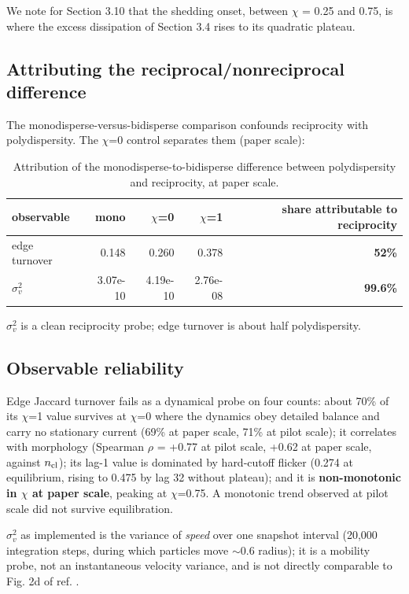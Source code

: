 \documentclass[aps,pre,preprint,superscriptaddress,nofootinbib,longbibliography]{revtex4-2}
\begin{document}
We note for Section 3.10 that the shedding onset, between $\chi$ = 0.25 and 0.75, is where the excess dissipation of Section 3.4 rises to its quadratic plateau.

\subsection{Attributing the reciprocal/nonreciprocal difference}

The monodisperse-versus-bidisperse comparison confounds reciprocity with polydispersity. The $\chi$=0 control separates them (paper scale):

\begin{table}[htbp]
\caption{Attribution of the monodisperse-to-bidisperse difference between polydispersity and reciprocity, at paper scale.}
\label{tab:6}
\begin{ruledtabular}
\begin{tabular}{lrrrr}
observable & mono & $\chi$=0 & $\chi$=1 & share attributable to reciprocity \\
\hline
edge turnover & 0.148 & 0.260 & 0.378 & \textbf{52\%} \\
$\sigma^2_v$ & 3.07e-10 & 4.19e-10 & 2.76e-08 & \textbf{99.6\%} \\
\end{tabular}
\end{ruledtabular}
\end{table}

$\sigma^2_v$ is a clean reciprocity probe; edge turnover is about half polydispersity.

\subsection{Observable reliability}

Edge Jaccard turnover fails as a dynamical probe on four counts: about 70\% of its $\chi$=1 value survives at $\chi$=0 where the dynamics obey detailed balance and carry no stationary current (69\% at paper scale, 71\% at pilot scale); it correlates with morphology (Spearman $\rho$ = +0.77 at pilot scale, +0.62 at paper scale, against $n_{\rm cl}$); its lag-1 value is dominated by hard-cutoff flicker (0.274 at equilibrium, rising to 0.475 by lag 32 without plateau); and it is \textbf{non-monotonic in $\chi$ at paper scale}, peaking at $\chi$=0.75. A monotonic trend observed at pilot scale did not survive equilibration.

$\sigma^2_v$ as implemented is the variance of \emph{speed} over one snapshot interval (20,000 integration steps, during which particles move $\sim$0.6 radius); it is a mobility probe, not an instantaneous velocity variance, and is not directly comparable to Fig. 2d of ref. \cite{r1}.
\end{document}
